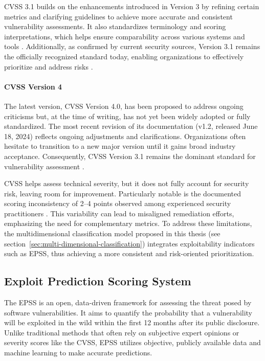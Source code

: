 \ac{CVSS} 3.1 builds on the enhancements introduced in Version 3 by refining certain metrics and clarifying guidelines to achieve more accurate and consistent vulnerability assessments. It also standardizes terminology and scoring interpretations, which helps ensure comparability across various systems and tools \autocite{first_cvss_2024}. Additionally, as confirmed by current security sources, Version 3.1 remains the officially recognized standard today, enabling organizations to effectively prioritize and address risks \autocite{heise_online_von_2021}.


\paragraph{CVSS Version 4}
\label{par:cvss-v4}

The latest version, \ac{CVSS} Version 4.0, has been proposed to address ongoing criticisms but, at the time of writing, has not yet been widely adopted or fully standardized. The most recent revision of its documentation (v1.2, released June 18, 2024) reflects ongoing adjustments and clarifications. Organizations often hesitate to transition to a new major version until it gains broad industry acceptance. Consequently, \ac{CVSS} Version 3.1 remains the dominant standard for vulnerability assessment \autocite{first_cvss_2024_v4}.

\ac{CVSS} helps assess technical severity, but it does not fully account for security risk, leaving room for improvement. Particularly notable is the documented scoring inconsistency of 2–4 points observed among experienced security practitioners \autocite{spring_time_2021}. This variability can lead to misaligned remediation efforts, emphasizing the need for complementary metrics. To address these limitations, the multidimensional classification model proposed in this thesis (see section~\ref{sec:multi-dimensional-classification}) integrates exploitability indicators such as \ac{EPSS}, thus achieving a more consistent and risk-oriented prioritization.

\subsection{Exploit Prediction Scoring System}
\label{subsec:epss-theoretical-basis}

The \ac{EPSS} is an open, data-driven framework for assessing the threat posed by software vulnerabilities. It aims to quantify the probability that a vulnerability will be exploited in the wild within the first 12 months after its public disclosure. Unlike traditional methods that often rely on subjective expert opinions or severity scores like the \ac{CVSS}, \ac{EPSS} utilizes objective, publicly available data and machine learning to make accurate predictions.


